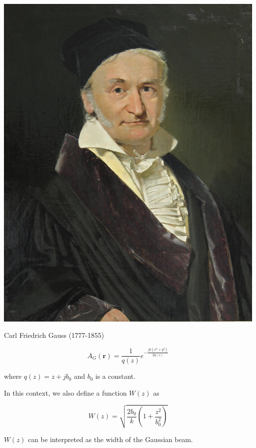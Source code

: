 \begin{marginfigure}[-.7cm]
\includegraphics{hermite/figures/c_gauss}
\caption{Carl Friedrich Gauss (1777-1855)}
\end{marginfigure}

\begin{equation}
A_G({\mathbf r}) = \frac{1}{q(z)}e^{-\frac{jk\left(x^2 + y^2\right)}{2q(z)}} \label{eq-gauss}
\end{equation}   

where $q(z)=z+jb_0$ and $b_0$ is a constant. 

In this context, we also define a function $W(z)$ as

\begin{equation}
W(z)=\sqrt{\frac{2 b_0}{k} \left(1 + \frac{z^2}{b_0^2}\right)} \label{eq-W}
\end{equation} 

$W(z)$ can be interpreted as the width of the Gaussian beam.

